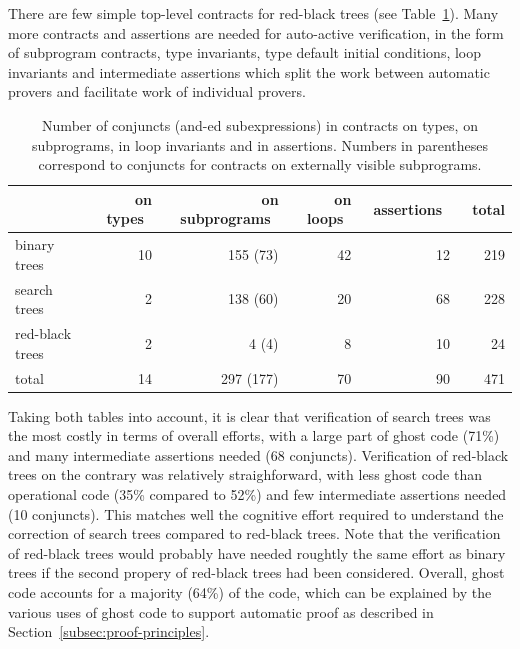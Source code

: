 \documentclass{llncs}
\begin{document}
There are few simple top-level contracts for red-black trees
(see Table~\ref{tab-sloc2}).  Many more
contracts and assertions are needed for auto-active verification, in the form
of subprogram contracts, type invariants, type default initial conditions, loop
invariants and intermediate assertions which split the work between automatic
provers and facilitate work of individual provers.

\begin{table}[ht]
\vspace{-0.5cm}
\begin{center}
\begin{tabular}{l||r|r|r|r|r}
                & ~on types~ & ~on subprograms~ & ~on loops~ & ~assertions~ & ~total \\ \hline
binary trees    & 10       & 155 (73)       & 42       & 12         & 219 \\
search trees    & 2        & 138 (60)       & 20       & 68         & 228 \\
red-black trees & 2        & 4 (4)          & 8        & 10         & 24 \\ \hline
total           & 14       & 297 (177)      & 70       & 90         & 471
\end{tabular}
\vspace*{5mm}
\caption{\label{tab-sloc2} Number of conjuncts (and-ed subexpressions) in contracts on types, on
  subprograms, in loop invariants and in assertions. Numbers in parentheses
  correspond to conjuncts for contracts on externally visible subprograms.}
\vspace*{-10mm}
\end{center}
\end{table}

Taking both tables into account, it is clear that verification of search trees
was the most costly in terms of overall efforts, with a large part of ghost
code (71\%) and many intermediate assertions needed (68
conjuncts). Verification of red-black trees on the contrary was relatively
straighforward, with less ghost code than operational code (35\% compared to
52\%) and few intermediate assertions needed (10 conjuncts). This matches well
the cognitive effort required to understand the correction of search trees
compared to red-black trees. Note that the verification of red-black trees
would probably have needed roughtly the same effort as binary trees if the
second propery of red-black trees had been considered.
Overall, ghost code accounts for a majority (64\%) of the code, which can be
explained by the various uses of ghost code to support automatic proof as
described in Section~\ref{subsec:proof-principles}.
\end{document}
